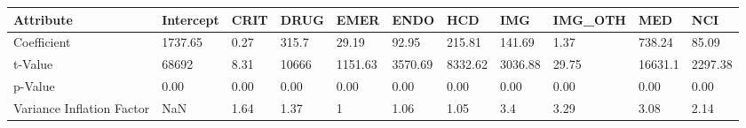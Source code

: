 \begin{tabular}{lllllllllll}
\toprule
Attribute & Intercept &  CRIT &   DRUG &     EMER &     ENDO &      HCD &      IMG & IMG\_OTH &      MED &      NCI \\
\midrule
Coefficient               &   1737.65 &  0.27 &  315.7 &    29.19 &    92.95 &   215.81 &   141.69 &    1.37 &   738.24 &    85.09 \\
t-Value                   &     68692 &  8.31 &  10666 &  1151.63 &  3570.69 &  8332.62 &  3036.88 &   29.75 &  16631.1 &  2297.38 \\
p-Value                   &      0.00 &  0.00 &   0.00 &     0.00 &     0.00 &     0.00 &     0.00 &    0.00 &     0.00 &     0.00 \\
Variance Inflation Factor &       NaN &  1.64 &   1.37 &        1 &     1.06 &     1.05 &      3.4 &    3.29 &     3.08 &     2.14 \\
\bottomrule
\end{tabular}
